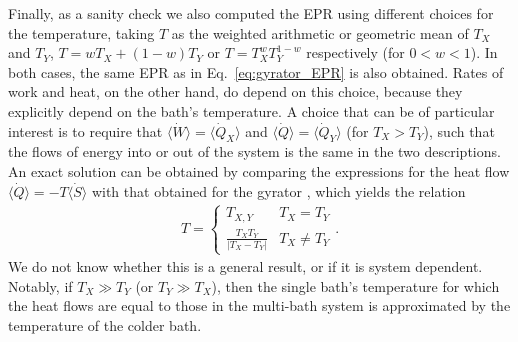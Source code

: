 Finally, as a sanity check we also computed the EPR using different choices for the temperature, taking $T$ as the weighted arithmetic or geometric mean of $T_X$ and $T_Y$, $T=wT_X+(1-w)T_Y$ or $T=T_X^wT_Y^{1-w}$ respectively (for $0 < w < 1$). In both cases, the same EPR as in Eq.~\ref{eq:gyrator_EPR} is also obtained. Rates of work and heat, on the other hand, do depend on this choice, because they explicitly depend on the bath's temperature.
A choice that can be of particular interest is to require that $\langle \dot W\rangle = \langle \dot Q _X \rangle$ and $\langle \dot{Q}\rangle = \langle \dot{Q}_Y\rangle$ (for $T_X>T_Y$), such that the flows of energy into or out of the system is the same in the two descriptions. An exact solution can be obtained by comparing the expressions for the heat flow $\langle \dot{Q} \rangle = -T\langle\dot S\rangle$ with that obtained for the gyrator \cite{bae2021inertial}, which yields the relation
\begin{align}
    T = \begin{cases}
                T_{X, Y} & T_X=T_Y \\
            \frac{T_X T_Y}{|T_X - T_Y|} & T_X \neq T_Y
    \end{cases}.
\end{align}
We do not know whether this is a general result, or if it is system dependent. Notably, if $T_X \gg T_Y$ (or $T_Y \gg T_X$), then the single bath's temperature for which the heat flows are equal to those in the multi-bath system is approximated by the temperature of the colder bath.

